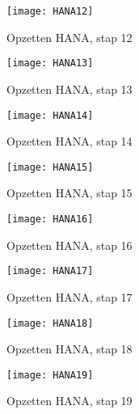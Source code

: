             \begin{figure}	
                \centering
                \texttt{[image: HANA12]}
                \caption{Opzetten HANA, stap 12} \label{HANA12}
            \end{figure}
        
            \begin{figure}	
                \centering
                \texttt{[image: HANA13]}
                \caption{Opzetten HANA, stap 13} \label{HANA13}
            \end{figure}
            
            \begin{figure}	
                \centering
                \texttt{[image: HANA14]}
                \caption{Opzetten HANA, stap 14} \label{HANA14}
            \end{figure}
            
            \begin{figure}	
                \centering
                \texttt{[image: HANA15]}
                \caption{Opzetten HANA, stap 15} \label{HANA15}
            \end{figure}
        
            \begin{figure}	
                \centering
                \texttt{[image: HANA16]}
                \caption{Opzetten HANA, stap 16} \label{HANA16}
            \end{figure}
            
            \begin{figure}	
                \centering
                \texttt{[image: HANA17]}
                \caption{Opzetten HANA, stap 17} \label{HANA17}
            \end{figure}
        
            \begin{figure}	
                \centering
                \texttt{[image: HANA18]}
                \caption{Opzetten HANA, stap 18} \label{HANA18}
            \end{figure}
            
            \begin{figure}	
                \centering
                \texttt{[image: HANA19]}
                \caption{Opzetten HANA, stap 19} \label{HANA19}
            \end{figure}
        
